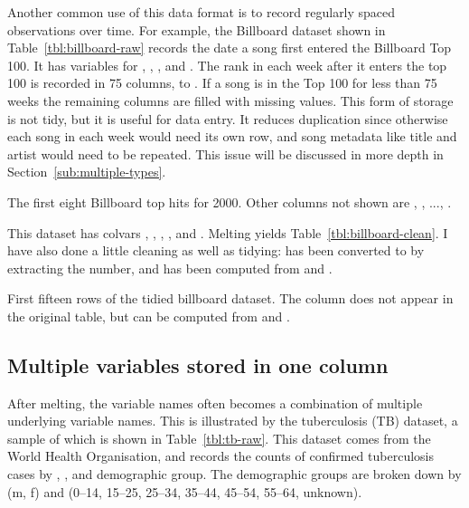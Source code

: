 \documentclass[article]{jss}
\begin{document}
Another common use of this data format is to record regularly spaced observations over time. For example, the Billboard dataset shown in Table~\ref{tbl:billboard-raw} records the date a song first entered the Billboard Top 100. It has variables for , , ,  and . The rank in each week after it enters the top 100 is recorded in 75 columns,  to . If a song is in the Top 100 for less than 75 weeks the remaining columns are filled with missing values. This form of storage is not tidy, but it is useful for data entry. It reduces duplication since otherwise each song in each week would need its own row, and song metadata like title and artist would need to be repeated. This issue will be discussed in more depth in Section~\ref{sub:multiple-types}.

\begin{table}[htbp]
  \centering
  
  \caption{The first eight Billboard top hits for 2000. Other columns not shown are , , ..., .}
  \label{tbl:billboard-raw}
\end{table}

This dataset has colvars , , , , and . Melting yields Table~\ref{tbl:billboard-clean}. I have also done a little cleaning as well as tidying:  has been converted to  by extracting the number, and  has been computed from  and .

\begin{table}[htbp]
  \centering
  
  \caption{First fifteen rows of the tidied billboard dataset. The  column does not appear in the original table, but can be computed from  and .}
  \label{tbl:billboard-clean}
\end{table}

\subsection{Multiple variables stored in one column}

After melting, the  variable names often becomes a combination of multiple underlying variable names. This is illustrated by the tuberculosis (TB) dataset, a sample of which is shown in Table~\ref{tbl:tb-raw}. This dataset comes from the World Health Organisation, and records the counts of confirmed tuberculosis cases by , , and demographic group. The demographic groups are broken down by  (m, f) and  (0--14, 15--25, 25--34, 35--44, 45--54, 55--64, unknown). 
\end{document}
